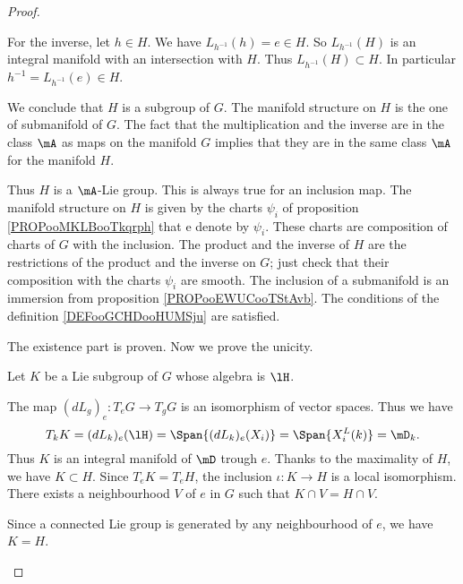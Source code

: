 \begin{proof}
\begin{subproof}
		For the inverse, let \( h\in H\). We have \( L_{h^{-1}}(h)=e\in H\). So \( L_{h^{-1}}(H)\) is an integral manifold with an intersection with \( H\). Thus \( L_{h^{-1}}(H)\subset H\). In particular \( h^{-1}=L_{h^{-1}}(e)\in H\).

		We conclude that \( H\) is a subgroup of \( G\).
		The manifold structure on \( H\) is the one of submanifold of \( G\). The fact that the multiplication and the inverse are in the class \( \mA\) as maps on the manifold \( G\) implies that they are in the same class \( \mA\) for the manifold \( H\).

		Thus \( H\) is a \( \mA\)-Lie group.
		This is always true for an inclusion map.
		The manifold structure on \( H\) is given by the charts \( \psi_i\) of proposition \ref{PROPooMKLBooTkqrph} that e denote by \( \psi_i\). These charts are composition of charts of \( G\) with the inclusion. The product and the inverse of \( H\) are the restrictions of the product and the inverse on \( G\); just check that their composition with the charts \( \psi_i\) are smooth.
		The inclusion of a submanifold is an immersion from proposition \ref{PROPooEWUCooTStAvb}.
		The conditions of the definition \ref{DEFooGCHDooHUMSju} are satisfied.
	\end{subproof}
	The existence part is proven. Now we prove the unicity.

	Let \( K\) be a Lie subgroup of \( G\) whose algebra is \( \lH\).
	\begin{subproof}
		\spitem[\( T_kK=\mD_k\)]
		The map \( (dL_g)_e\colon T_eG\to T_gG\) is an isomorphism of vector spaces. Thus we have
		\begin{equation}
			T_kK=(dL_k)_e(\lH)=\Span\{ (dL_k)_e(X_i) \}=\Span\{ X_i^L(k) \}=\mD_k.
		\end{equation}
		\spitem[Maximality]
		Thus \( K\) is an integral manifold of \( \mD\) trough \( e\). Thanks to the maximality of \( H\), we have \( K\subset H\). Since \( T_eK=T_eH\), the inclusion \( \iota\colon K\to H\) is a local isomorphism. There exists a neighbourhood \( V\) of \( e\) in \( G\) such that \( K\cap V=H\cap V\).

		Since a connected Lie group is generated by any neighbourhood of \( e\), we have \( K=H\).
	\end{subproof}
\end{proof}


